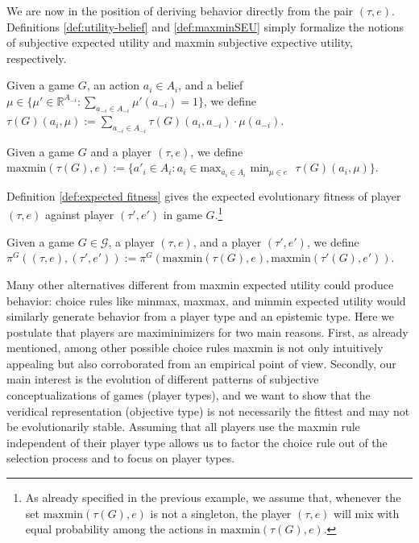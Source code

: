 \documentclass[fleqn,reqno,11pt]{article}
\begin{document}
We are now in the position of deriving behavior directly from the pair $(\tau, e)$. Definitions \ref{def:utility-belief} and \ref{def:maxminSEU} simply formalize the notions of subjective expected utility and maxmin subjective expective utility, respectively. 

\begin{definition} \label{def:utility-belief}

Given a game $G$, an action $a_i \in A_i$, and a belief $\mu \in \lbrace \mu' \in \mathbb{R}^{A_{-i}}: \sum_{a_{-i} \in A_{-i}} \mu'(a_{-i}) = 1 \rbrace$, we define $\tau(G)(a_i, \mu):= \sum_{a_{-i} \in A_{-i}} \tau(G)(a_i, a_{-i}) \cdot \mu(a_{-i})$. 

\end{definition}

\begin{definition} \label{def:maxminSEU}

Given a game $G$ and a player $(\tau, e)$, we define $\text{maxmin}(\tau(G), e):= \lbrace a'_i \in A_i : a_i \in \text{max}_{a_i \in A_i} \text{ min}_{\mu \in e} \text{ } \tau(G)(a_i, \mu) \rbrace$.

\end{definition}

\noindent Definition \ref{def:expected fitness} gives the expected evolutionary fitness of player $(\tau, e)$ against player $(\tau', e')$ in game $G$.\footnote{As already specified in the previous example, we assume that, whenever the set $\text{maxmin}(\tau(G), e)$ is not a singleton, the player $(\tau, e)$ will mix with equal probability among the actions in $\text{maxmin}(\tau(G), e)$.}

\begin{definition} \label{def:expected fitness}

Given a game $G \in \mathcal{G}$, a player $(\tau, e)$, and a player $(\tau', e')$, we define $\pi^G((\tau, e),(\tau', e')):= \pi^G(\text{maxmin}(\tau(G), e),\text{maxmin}(\tau'(G), e'))$. 

\end{definition}


Many other alternatives different from maxmin expected utility could produce behavior: choice rules like minmax, maxmax, and minmin expected utility would similarly generate behavior from a player type and an epistemic type. Here we postulate that players are maximinimizers for two main reasons. First, as already mentioned, among other possible choice rules maxmin is not only intuitively appealing but also corroborated from an empirical point of view. Secondly, our main interest is the evolution of different patterns of subjective conceptualizations of games (player types), and we want to show that the veridical representation (objective type) is not necessarily the fittest and may not be evolutionarily stable. Assuming that all players use the maxmin rule independent of their player type allows us to factor the choice rule out of the selection process and to focus on player types.
\end{document}
